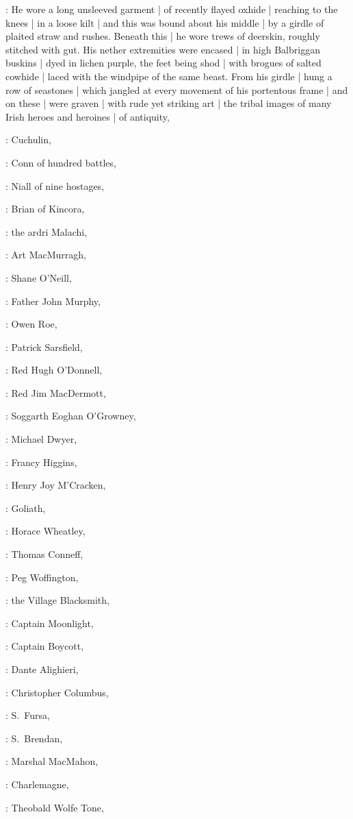 :
He wore a long unsleeved garment |
of recently flayed oxhide |
reaching to the knees |
in a loose kilt |
and this was bound about his middle |
by a girdle of plaited straw and rushes.
Beneath this |
he wore trews of deerskin,
roughly stitched with gut.
His nether extremities were encased |
in high Balbriggan buskins |
dyed in lichen purple,
the feet being shod |
with brogues of salted cowhide |
laced with the windpipe of the same beast.
From his girdle |
hung a row of seastones |
which jangled at every movement of his portentous frame |
and on these |
were graven |
with rude yet striking art |
the tribal images of many Irish heroes and heroines |
of antiquity,

:
Cuchulin,

:
Conn of hundred battles,

:
Niall of nine hostages,

:
Brian of Kincora,

:
the ardri Malachi,

:
Art MacMurragh,

:
Shane O'Neill,

:
Father John Murphy,

:
Owen Roe,

:
Patrick Sarsfield,

:
Red Hugh O'Donnell,

:
Red Jim MacDermott,

:
Soggarth Eoghan O'Growney,

:
Michael Dwyer,

:
Francy Higgins,

:
Henry Joy M'Cracken,

:
Goliath,

:
Horace Wheatley,

:
Thomas Conneff,

:
Peg Woffington,

:
the Village Blacksmith,

:
Captain Moonlight,

:
Captain Boycott,

:
Dante Alighieri,

:
Christopher Columbus,

:
S.~Fursa,

:
S.~Brendan,

:
Marshal MacMahon,

:
Charlemagne,

:
Theobald Wolfe Tone,

